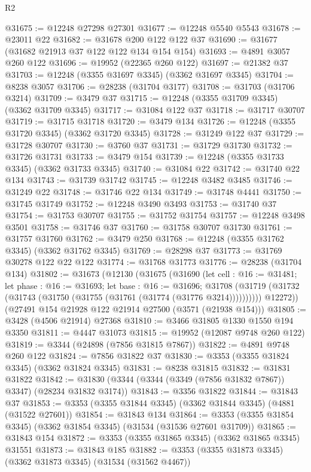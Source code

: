 \begin{lexlean}{R2}
\begin{coremodule}
@31675 := @12248 @27298 @27301
@31677 := @12248 @5540 @5543
@31678 := @23011 @22
@31682 := @31678 @200 @122 @122 @37
@31690 := @31677 (@31682 @21913 @37 @122 @122 @134 @154 @154)
@31693 := @4891 @3057 @260 @122
@31696 := @19952 (@22365 @260 @122)
@31697 := @21382 @37
@31703 := @12248 (@3355 @31697 @3345) (@3362 @31697 @3345)
@31704 := @8238 @3057
@31706 := @28238 (@31704 @3177)
@31708 := @31703 (@31706 @3214)
@31709 := @3479 @37
@31715 := @12248 (@3355 @31709 @3345) (@3362 @31709 @3345)
@31717 := @31084 @122 @37
@31718 := @31717 @30707
@31719 := @31715 @31718
@31720 := @3479 @134
@31726 := @12248 (@3355 @31720 @3345) (@3362 @31720 @3345)
@31728 := @31249 @122 @37
@31729 := @31728 @30707
@31730 := @3760 @37
@31731 := @31729 @31730
@31732 := @31726 @31731
@31733 := @3479 @154
@31739 := @12248 (@3355 @31733 @3345) (@3362 @31733 @3345)
@31740 := @31084 @22
@31742 := @31740 @22 @134
@31743 := @31739 @31742
@31745 := @12248 @3482 @3485
@31746 := @31249 @22
@31748 := @31746 @22 @134
@31749 := @31748 @4441
@31750 := @31745 @31749
@31752 := @12248 @3490 @3493
@31753 := @31740 @37
@31754 := @31753 @30707
@31755 := @31752 @31754
@31757 := @12248 @3498 @3501
@31758 := @31746 @37
@31760 := @31758 @30707 @31730
@31761 := @31757 @31760
@31762 := @3479 @250
@31768 := @12248 (@3355 @31762 @3345) (@3362 @31762 @3345)
@31769 := @28298 @37
@31773 := @31769 @30278 @122 @22 @122
@31774 := @31768 @31773
@31776 := @28238 (@31704 @134)
@31802 := @31673
    (@12130
      (@31675
        (@31690
          (let cell : @16 := @31481;
          let phase : @16 := @31693;
          let base : @16 := @31696;
          @31708 (@31719 (@31732 (@31743 (@31750 (@31755 (@31761 (@31774 (@31776 @3214))))))))))
        @12272))
    (@27491 @154 @21928 @122 @21914 @27500 (@3571 (@21938 @154)))
@31805 := @3428 (@4506 @21914) @27368
@31810 := @3466 @31805 @1330 @1550 @194 @3350
@31811 := @4447 @31073
@31815 := @19952 (@12087 @9748 @260 @122)
@31819 := @3344 (@24898 (@7856 @31815 @7867))
@31822 := @4891 @9748 @260 @122
@31824 := @7856 @31822 @37
@31830 := @3353 (@3355 @31824 @3345) (@3362 @31824 @3345)
@31831 := @8238 @31815
@31832 := @31831 @31822
@31842 := @31830 (@3344 (@3344 (@3349 (@7856 @31832 @7867)) @3347) (@28234 @31832 @3174))
@31843 := @3356 @31822
@31844 := @31843 @37
@31853 := @3353 (@3355 @31844 @3345) (@3362 @31844 @3345) (@4881 (@31522 @27601))
@31854 := @31843 @134
@31864 := @3353 (@3355 @31854 @3345) (@3362 @31854 @3345) (@31534 (@31536 @27601 @31709))
@31865 := @31843 @154
@31872 := @3353 (@3355 @31865 @3345) (@3362 @31865 @3345) @31551
@31873 := @31843 @185
@31882 := @3353 (@3355 @31873 @3345) (@3362 @31873 @3345) (@31534 (@31562 @4467))

\end{coremodule}
\end{lexlean}
